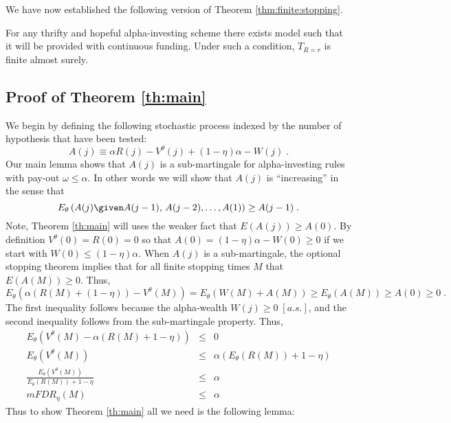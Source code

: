 \documentclass[12pt]{article}
\begin{document}
\hfill\QED

\noindent
We have now established the following version of Theorem
\ref{thm:finite:stopping}. 
\begin{theorem}
For any thrifty and hopeful alpha-investing scheme there exists model
such that it will be provided with continuous funding.  Under such a
condition, $T_{R=r}$ is finite almost surely.
\end{theorem}


\subsection*{Proof of Theorem \ref{th:main}}

We begin by defining the following stochastic process indexed by the
 number of hypothesis that have been tested:
\begin{displaymath}
    A(j) \equiv \alpha R(j) -  V^\theta(j)  + (1 - \eta)\alpha - W(j) \; .  
\end{displaymath}
Our main lemma shows that $A(j)$ is a sub-martingale for
 alpha-investing rules with pay-out $\omega \le \alpha$.  In other
 words we will show that $A(j)$ is ``increasing'' in the sense that
\begin{displaymath}
  E_\theta\left( A(j) \given A(j-1),\,A(j-2),\ldots, A(1)\right)
  \ge A(j-1) \;.
\end{displaymath}
Note, Theorem \ref{th:main} will uses the weaker fact that
 $E(A(j)) \ge A(0)$.  By definition $V^\theta(0) = R(0) = 0$ so that
 $A(0) = (1 - \eta)\alpha - W(0) \ge 0$ if we start with $W(0) \le
 (1 - \eta)\alpha$.  When $A(j)$ is a sub-martingale, the optional stopping
 theorem implies that for all finite stopping times $M$ that $E(A(M))
 \ge 0$.  Thus,
\begin{displaymath}
E_\theta(\alpha (R(M)+(1 - \eta)) - V^\theta(M)) =  E_\theta(W(M) + A(M) )
  \ge E_\theta(A(M))
  \ge A(0) \ge 0 \; .
\end{displaymath}
The first inequality follows because the alpha-wealth $W(j) \ge 0 \;
 [a.s.]$, and the second inequality follows from the sub-martingale
 property.  Thus,
\begin{eqnarray*}
E_\theta(V^\theta(M) - \alpha (R(M)+1 - \eta)) & \le & 0 \\
E_\theta(V^\theta(M)) & \le &  \alpha (E_\theta(R(M))+1 - \eta) \\
\frac{E_\theta(V^\theta(M))}{ E_\theta(R(M))+1 - \eta}  & \le &  \alpha\\
mFDR_\eta(M) &\le&  \alpha
\end{eqnarray*}
Thus to show Theorem \ref{th:main} all we need is the following lemma:
\end{document}
